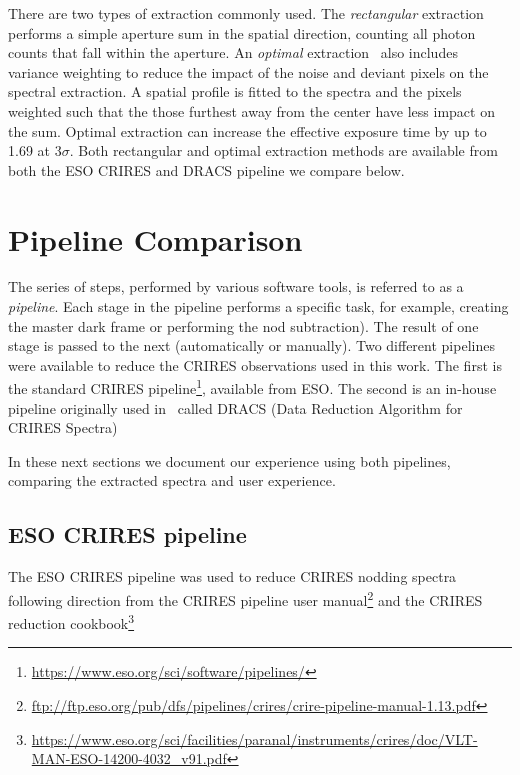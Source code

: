 There are two types of extraction commonly used. The \emph{rectangular} extraction performs a simple aperture sum in the spatial direction, counting all photon counts that fall within the aperture. An \emph{optimal} extraction~\citep{horne_optimal_1986} also includes variance weighting to reduce the impact of the noise and deviant pixels on the spectral extraction. A spatial profile is fitted to the spectra and the pixels weighted such that the those furthest away from the center have less impact on the sum. Optimal extraction can increase the effective exposure time by up to 1.69 at \(3 \sigma\)\citep{horne_optimal_1986}. Both rectangular and optimal extraction methods are available from both the ESO CRIRES and DRACS pipeline we compare below.

\section{Pipeline Comparison}
\label{sec:pipelines}
The series of steps, performed by various software tools, is referred to as a \emph{pipeline}. Each stage in the pipeline performs a specific task, for example, creating the master dark frame or performing the nod subtraction). The result of one stage is passed to the next (automatically or manually). Two different pipelines were available to reduce the CRIRES observations used in this work. The first is the standard CRIRES pipeline\footnote{\href{https://www.eso.org/sci/software/pipelines/}{https://www.eso.org/sci/software/pipelines/}}, available from ESO.
The second is an in-house pipeline originally  used in~\citet{figueira_radial_2010} called DRACS (Data Reduction Algorithm for CRIRES Spectra) 

In these next sections we document our experience using both pipelines, comparing the extracted spectra and user experience.


\subsection{ESO CRIRES pipeline}
\label{subsec:eso-crires}
The ESO CRIRES pipeline was used to reduce CRIRES nodding spectra following direction from the CRIRES pipeline user manual\footnote{\href{ftp://ftp.eso.org/pub/dfs/pipelines/crires/crire-pipeline-manual-1.13.pdf}{ftp://ftp.eso.org/pub/dfs/pipelines/crires/crire-pipeline-manual-1.13.pdf}} and the CRIRES reduction cookbook\footnote{\href{https://www.eso.org/sci/facilities/paranal/instruments/crires/doc/VLT-MAN-ESO-14200-4032\_v91.pdf}{https://www.eso.org/sci/facilities/paranal/instruments/crires/doc/VLT-MAN-ESO-14200-4032\_v91.pdf}}

